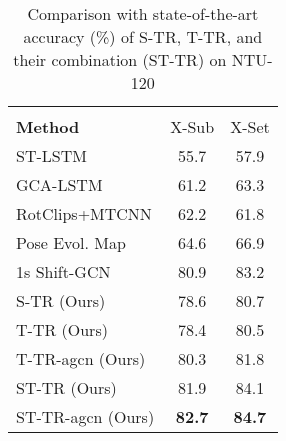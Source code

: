 \documentclass[review]{cvpr}
\begin{document}
\begin{table}[t!]
\setlength{\tabcolsep}{1pt}
    \begin{center}
    \begin{tabular}{lcc}
    \hline\noalign{\smallskip}
    \multicolumn{3}{c}{\textbf{NTU-120}}\\
    \cline{1-3}\noalign{\smallskip}
    {\textbf{Method}} & X-Sub & X-Set\\
    \noalign{\smallskip}
    \hline
    {ST-LSTM \cite{st-lstm}} & 55.7 & 57.9 \\
    {GCA-LSTM \cite{gca}} & 61.2 & 63.3 \\
    {RotClips+MTCNN \cite{lcr}} &62.2&61.8\\

    {Pose Evol. Map \cite{bpe}} & 64.6 & 66.9\\
    1s Shift-GCN \cite{shift} & 80.9 & 83.2 \\
    \hline
    \noalign{\smallskip}
    {S-TR} (Ours) & 78.6 & 80.7 \\
    {T-TR} (Ours) &   78.4 & 80.5 \\
    {T-TR-agcn} (Ours) & 80.3 & 81.8\\
    
    \hline
    {ST-TR} (Ours) & 81.9 & 84.1 \\
    ST-TR-agcn (Ours) &\textbf{82.7} &\textbf{84.7} \\
    \hline
    \end{tabular}
    \end{center}
    \caption{Comparison with state-of-the-art accuracy (\%) of S-TR, T-TR, and their combination (ST-TR) on NTU-120}
    \label{table:3}

\end{table}
\end{document}
